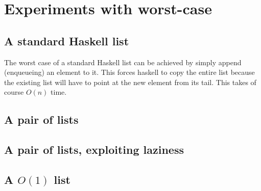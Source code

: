 \section*{Experiments with worst-case}

\subsection*{A standard Haskell list}
The worst case of a standard Haskell list can be achieved by simply append (enqueueing) an element to it. This forces haskell to copy the entire list because the existing list will have to point at the new element from its tail. This takes of course $O(n)$ time.
\subsection*{A pair of lists}
\subsection*{A pair of lists, exploiting laziness}
\subsection*{A $O(1)$ list}